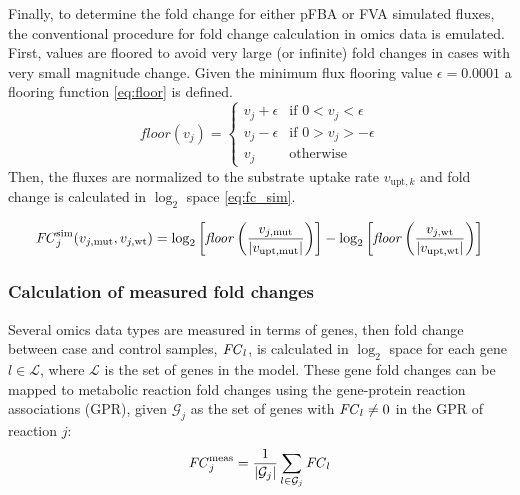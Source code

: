 Finally, to determine the fold change for either pFBA or FVA simulated fluxes, the conventional procedure for fold change calculation in omics data is emulated. First, values are floored to avoid very large (or infinite) fold changes in cases with very small magnitude change. Given the minimum flux flooring value $\epsilon=0.0001$ a flooring function \eqref{eq:floor} is defined.
\begin{equation} \label{eq:floor}
    \mathit{floor}(v_j) = \begin{cases}
        v_j + \epsilon &\text{if } 0 < v_j < \epsilon \\
        v_j - \epsilon &\text{if } 0 > v_j > -\epsilon \\
        v_j     &\text{otherwise }
    \end{cases}
\end{equation}
Then, the fluxes are normalized to the substrate uptake rate $v_{\text{upt},k}$ and fold change is calculated in $\log_2$ space \eqref{eq:fc_sim}.

\begin{equation} \label{eq:fc_sim}
    \mathit{FC}_j^{\mathrm{sim}} (v_{j,\text{mut}}, v_{j,\text{wt}}) = \log_2 \left[ \mathit{floor}\left( \frac{v_{j,\text{mut}}}{|v_{\text{upt,mut}}|} \right) \right] -
    \log_2 \left[ \mathit{floor}\left( \frac{v_{j,\text{wt}}}{|v_{\text{upt,wt}}|} \right) \right]
\end{equation}

\subsubsection{Calculation of measured fold changes}
Several omics data types are measured in terms of genes, then fold change between case and control samples, $\mathit{FC}_l$, is calculated in $\log_2$ space for each gene $l\in \mathcal{L}$, where $\mathcal{L}$ is the set of genes in the model. These gene fold changes can be mapped to metabolic reaction fold changes using the gene-protein reaction associations (GPR), given $\mathcal{G}_j$ as the set of genes with $\mathit{FC}_l \ne 0$ in the GPR of reaction $j$:
\begin{equation}
    \mathit{FC}_j^{\mathrm{meas}} = \frac{1}{|\mathcal{G}_j|}\sum_{l \in \mathcal{G}_j} \mathit{FC}_l \label{eq:fc_meas}
\end{equation}

